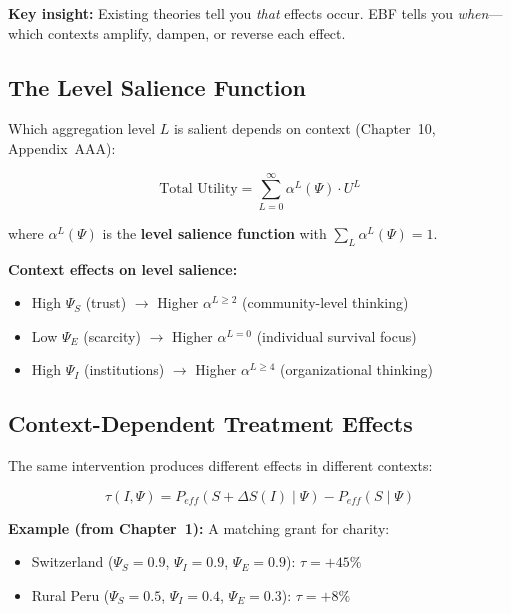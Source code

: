 \textbf{Key insight:} Existing theories tell you \emph{that} effects occur.
EBF tells you \emph{when}---which contexts amplify, dampen, or reverse each effect.

\subsection{The Level Salience Function}

Which aggregation level $L$ is salient depends on context (Chapter~10, Appendix~AAA):

\begin{equation}
\boxed{
\text{Total Utility} = \sum_{L=0}^{\infty} \alpha^L(\Psi) \cdot U^L
}
\label{eq:mp-level-salience}
\end{equation}

where $\alpha^L(\Psi)$ is the \textbf{level salience function} with $\sum_L \alpha^L(\Psi) = 1$.

\textbf{Context effects on level salience:}
\begin{itemize}
\item High $\Psi_S$ (trust) $\to$ Higher $\alpha^{L \geq 2}$ (community-level thinking)
\item Low $\Psi_E$ (scarcity) $\to$ Higher $\alpha^{L=0}$ (individual survival focus)
\item High $\Psi_I$ (institutions) $\to$ Higher $\alpha^{L \geq 4}$ (organizational thinking)
\end{itemize}

\subsection{Context-Dependent Treatment Effects}

The same intervention produces different effects in different contexts:

\begin{equation}
\tau(I, \Psi) = P_{eff}(S + \Delta S(I) \mid \Psi) - P_{eff}(S \mid \Psi)
\end{equation}

\textbf{Example (from Chapter~1):} A matching grant for charity:
\begin{itemize}
\item Switzerland ($\Psi_S = 0.9$, $\Psi_I = 0.9$, $\Psi_E = 0.9$): $\tau = +45\%$
\item Rural Peru ($\Psi_S = 0.5$, $\Psi_I = 0.4$, $\Psi_E = 0.3$): $\tau = +8\%$
\end{itemize}


